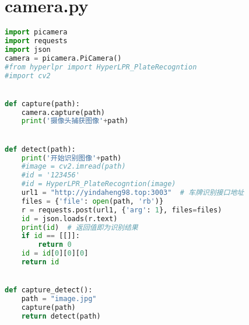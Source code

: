\section{camera.py}\label{apdx:camera.py}
\begin{lstlisting}[language=python]
import picamera
import requests
import json
camera = picamera.PiCamera()
#from hyperlpr import HyperLPR_PlateRecogntion
#import cv2


def capture(path):
    camera.capture(path)
    print('摄像头捕获图像'+path)


def detect(path):
    print('开始识别图像'+path)
    #image = cv2.imread(path)
    #id = '123456'
    #id = HyperLPR_PlateRecogntion(image)
    url1 = "http://yindaheng98.top:3003"  # 车牌识别接口地址
    files = {'file': open(path, 'rb')}
    r = requests.post(url1, {'arg': 1}, files=files)
    id = json.loads(r.text)
    print(id)  # 返回值即为识别结果
    if id == [[]]:
        return 0
    id = id[0][0][0]
    return id


def capture_detect():
    path = "image.jpg"
    capture(path)
    return detect(path)
\end{lstlisting}

